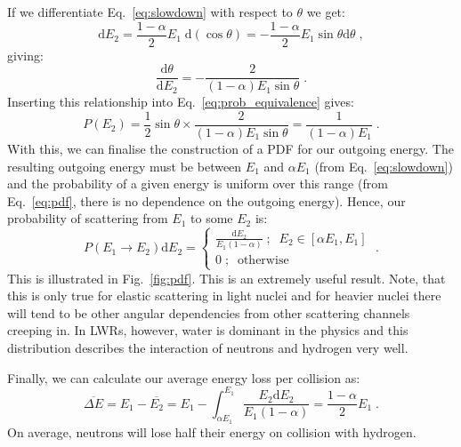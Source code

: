 If we differentiate Eq.~\eqref{eq:slowdown} with respect to $\theta$ we get:
\begin{equation*}
    \mathrm{d}E_2 = \frac{1-\alpha}{2}E_1\;\mathrm{d}\left(\cos\theta\right) = -\frac{1-\alpha}{2}E_1\sin\theta\mathrm{d}\theta\;\mathrm{,}
\end{equation*}
giving:
\begin{equation*}
    \frac{\mathrm{d}\theta}{\mathrm{d}E_2} = -\frac{2}{(1-\alpha)E_1\sin\theta}\;\mathrm{.}
\end{equation*}
Inserting this relationship into Eq.~\eqref{eq:prob_equivalence} gives:
\begin{equation}\label{eq:pdf}
    P(E_2) = \frac{1}{2}\sin\theta\times \frac{2}{(1-\alpha)E_1\sin\theta} = \frac{1}{(1-\alpha)E_1}\;\mathrm{.}
\end{equation}
With this, we can finalise the construction of a PDF for our outgoing energy. The resulting outgoing energy must be between $E_1$ and $\alpha E_1$ (from Eq.~\eqref{eq:slowdown}) and the probability of a given energy is uniform over this range (from Eq.~\eqref{eq:pdf}, there is no dependence on the outgoing energy). Hence, our probability of scattering from $E_1$ to some $E_2$ is:
\begin{equation*}
    P(E_1\rightarrow E_2)\mathrm{d}E_2 = \left\{\begin{array}{ll}
      \frac{\mathrm{d}E_2}{E_1 (1-\alpha)}\;\mathrm{;}\;\; E_2\in [\alpha E_1, E_1]\\
      0\;\mathrm{;}\;\;\mathrm{ otherwise}
      \end{array} 
      \right.
   \;\mathrm{.}
\end{equation*} 
This is illustrated in Fig.~\ref{fig:pdf}. This is an extremely useful result. Note, that this is only true for elastic scattering in light nuclei and for heavier nuclei there will tend to be other angular dependencies from other scattering channels creeping in. In LWRs, however, water is dominant in the physics and this distribution describes the interaction of neutrons and hydrogen very well.

Finally, we can calculate our average energy loss per collision as:
\begin{equation*}
    \overline{\Delta E} = E_1 - \overline{E_2} = E_1 - \int^{E_1}_{\alpha E_1}\frac{E_2\mathrm{d}E_2}{E_1(1-\alpha)} = \frac{1-\alpha}{2}E_1\;\mathrm{.}
\end{equation*}
On average, neutrons will lose half their energy on collision with hydrogen.

